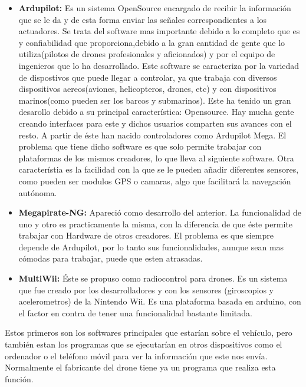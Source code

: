 	\begin{itemize}
		\item \textbf{Ardupilot:} Es un sistema OpenSource encargado de recibir la informaci\'on que se le da y de esta forma enviar las señales correspondientes a los actuadores. Se trata del software mas importante debido a lo completo que es y confiabilidad que proporciona,debido a la gran cantidad de gente que lo utiliza(pilotos de drones profesionales y aficionados) y por el equipo de ingenieros que lo ha desarrollado. Este software se caracteriza por la variedad de dispostivos que puede llegar a controlar, ya que trabaja con diversos dispositivos aereos(aviones, helicopteros, drones, etc) y con dispositivos marinos(como pueden ser los barcos y submarinos). Este ha tenido un gran desarollo debido a su principal caracter\'istica: Opensource. Hay mucha gente creando interfaces para este y dichos usuarios comparten sus avances con el resto. A partir de \'este han nacido controladores como Ardupilot Mega. El problema que tiene dicho software es que solo permite trabajar con plataformas de los mismos creadores, lo que lleva al siguiente software. Otra caracter\'istia es la facilidad con la que se le pueden añadir diferentes sensores, como pueden ser modulos GPS o camaras, algo que facilitar\'a la navegaci\'on aut\'onoma. 

	\item \textbf{Megapirate-NG:} Apareci\'o como desarrollo del anterior. La funcionalidad de uno y otro es practicamente la misma, con la diferencia de que \'este permite trabajar con Hardware de otros creadores. El problema es que siempre depende de Ardupilot, por lo tanto sus funcionalidades, aunque sean mas c\'omodas para trabajar, puede que esten atrasadas.

		\item \textbf{MultiWii:} \'Este se propuso como radiocontrol para drones. Es un sistema que fue creado por los desarrolladores y con los sensores (giroscopios y acelerometros) de la Nintendo Wii. Es una plataforma basada en arduino, con el factor en contra de tener una funcionalidad bastante limitada. 
	\end{itemize}


Estos primeros son los softwares principales que estar\'ian sobre el veh\'iculo, pero tambi\'en estan los programas que se ejecutar\'ian en otros dispositivos como el ordenador o el tel\'efono m\'ovil para ver la informaci\'on que este nos env\'ia. Normalmente el fabricante del drone tiene ya un programa que realiza esta funci\'on. 

